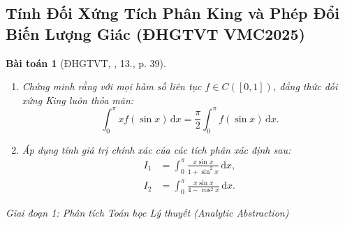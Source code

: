 \documentclass{article}
\newtheorem{baitoan}{Bài toán}
\begin{document}
\subsection{Tính Đối Xứng Tích Phân King và Phép Đổi Biến Lượng Giác (ĐHGTVT VMC2025)}

\begin{baitoan}[ĐHGTVT, \cite{VMS_VMC2025}, 13., p. 39]
\begin{enumerate}
    \item[(a)] Chứng minh rằng với mọi hàm số liên tục $f \in C([0, 1])$, đẳng thức đối xứng King luôn thỏa mãn:
    \begin{equation}
        \int_0^\pi x f(\sin x) \, \mathrm{d}x = \frac{\pi}{2} \int_0^\pi f(\sin x) \, \mathrm{d}x.
    \end{equation}
    \item[(b)] Áp dụng tính giá trị chính xác của các tích phân xác định sau:
    \begin{align}
        I_1 &= \int_0^\pi \frac{x \sin x}{1 + \sin^2 x} \, \mathrm{d}x, \\
        I_2 &= \int_0^\pi \frac{x \sin x}{4 - \cos^2 x} \, \mathrm{d}x.
    \end{align}
\end{enumerate}
\end{baitoan}

\vspace{0.5em}\noindent\emph{Giai đoạn 1: Phân tích Toán học Lý thuyết (Analytic Abstraction)}
\end{document}
